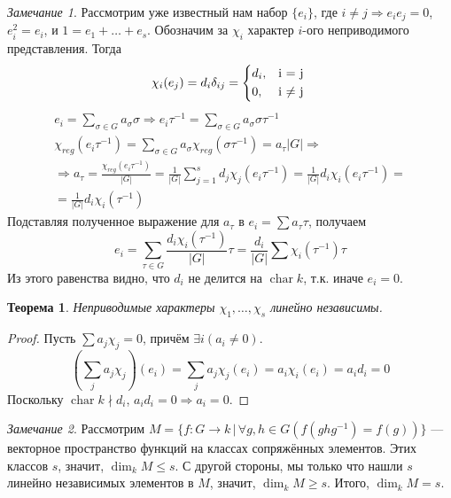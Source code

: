 \documentclass{article}
\newtheorem*{theorem}{Теорема}
\theoremstyle{definition}
\theoremstyle{remark}
\newtheorem*{remark}{Замечание}
\DeclareMathOperator{\chr}{char}
\newcommand{\Ra}{\Rightarrow}
\begin{document}
\begin{remark}
    Рассмотрим уже известный нам набор $\{e_i\}$, где $i \neq j \Ra e_i e_j = 0$, $e_i^2 = e_i$, и $1 = e_1 + \hdots + e_s$. Обозначим за $\chi_i$ характер $i$-ого неприводимого представления. Тогда
    \begin{equation*}
        \chi_i(e_j) = d_i \delta_{ij} = \begin{cases*}
            d_i, & i = j \\
            0, & i $\neq$ j
        \end{cases*}
    \end{equation*}
    \begin{gather*}
        e_i = \sum_{\sigma \in G} a_\sigma \sigma \Ra e_i \tau^{-1} = \sum_{\sigma \in G} a_\sigma \sigma \tau^{-1} \\
        \chi_{reg}(e_i \tau^{-1}) = \sum_{\sigma \in G} a_\sigma \chi_{reg}(\sigma \tau^{-1}) = a_\tau |G| \Ra \\
        \Ra a_\tau = \frac{\chi_{reg}(e_i \tau^{-1})}{|G|} = \frac{1}{|G|} \sum_{j = 1}^s d_j \chi_j(e_i \tau^{-1}) = \frac{1}{|G|} d_i \chi_i (e_i \tau^{-1}) = \\
        = \frac{1}{|G|} d_i \chi_i(\tau^{-1})
    \end{gather*}
    Подставляя полученное выражение для $a_\tau$ в $e_i = \sum a_\tau \tau$, получаем
    \begin{equation*}
        e_i = \sum_{\tau \in G} \frac{d_i \chi_i(\tau^{-1})}{|G|} \tau = \frac{d_i}{|G|} \sum \chi_i(\tau^{-1}) \tau
    \end{equation*}
    Из этого равенства видно, что $d_i$ не делится на $\chr k$, т.к. иначе $e_i = 0$.
\end{remark}

\begin{theorem}
    Неприводимые характеры $\chi_1, \hdots, \chi_s$ линейно независимы.
\end{theorem}
\begin{proof}
    Пусть $\sum a_j \chi_j = 0$, причём $\exists i (a_i \neq 0)$.
    \begin{equation*}
        \left(\sum_j a_j \chi_j\right)(e_i) = \sum_j a_j \chi_j(e_i) = a_i \chi_i(e_i) = a_i d_i = 0
    \end{equation*}
    Поскольку $\chr k \nmid d_i$, $a_i d_i = 0 \Ra a_i = 0$.
\end{proof}

\begin{remark}
    Рассмотрим $M = \{f: G \to k \,|\, \forall g, h \in G (f(g h g^{-1}) = f(g))\}$ --- векторное пространство функций на классах сопряжённых элементов. Этих классов $s$, значит, $\dim_k M \leq s$. С другой стороны, мы только что нашли $s$ линейно независимых элементов в $M$, значит, $\dim_k M \geq s$. Итого, $\dim_k M = s$.
\end{remark}
\end{document}

